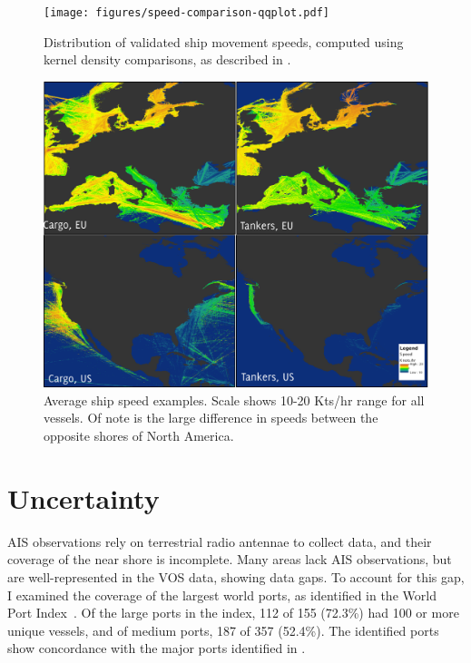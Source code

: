 \begin{figure}[t]
  \centering
  \hspace*{-0.2in}
  \texttt{[image: figures/speed-comparison-qqplot.pdf]}
  \caption[Validated ship speeds by class, kernel density estimation]{Distribution of validated ship movement speeds, computed using kernel density comparisons, as described in \cite{bowman1997applied}.}
  \label{fig:vessel-speed-density}
\end{figure}

\begin{figure}[t]
  \centering
  \includegraphics[width=150mm]{figures/speed_map_labeled.pdf}
  \caption[Average ship speeds, North America and Europe]{Average ship speed examples. Scale shows 10-20 Kts/hr range for all vessels. Of note is the large difference in speeds between the opposite shores of North America.}
  \label{fig:speed-ship-map}
\end{figure}

\section{Uncertainty}

AIS observations rely on terrestrial radio antennae to collect data, and their coverage of the near shore is incomplete. Many areas lack AIS observations, but are well-represented in the VOS data, showing data gaps. To account for this gap, I examined the coverage of the largest world ports, as identified in the World Port Index~\citep{worldportindex}. Of the large ports in the index, 112 of 155 (72.3\%) had 100 or more unique vessels, and of medium ports, 187 of 357 (52.4\%). The identified ports show concordance with the major ports identified in \cite{ducruet2012worldwide}. 

